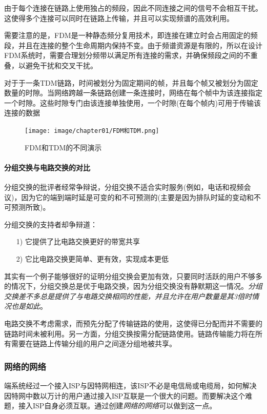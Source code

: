     由于每个连接在链路上使用独占的频段，因此不同连接之间的信号不会相互干扰。这使得多个连接可以同时在链路上传输，并且可以实现频谱的高效利用。
    
    需要注意的是，FDM是一种静态频分复用技术，即连接在建立时会占用固定的频段，并且在连接的整个生命周期内保持不变。由于频谱资源是有限的，所以在设计FDM系统时，需要合理划分频带以满足所有连接的需求，并确保频段之间的不重叠，以避免干扰和交叉干扰。
    
    对于于一条TDM链路，时间被划分为固定期间的帧，并且每个帧又被划分为固定数量的时隙。当网络跨越一条链路创建一条连接时，网络在每个帧中为该连接指定一个时隙。这些时隙专门由该连接单独使用，一个时隙(在每个帧内)可用于传输该连接的数据

\begin{figure}[!htbp]
    \centering
    \texttt{[image: image/chapter01/FDM和TDM.png]}
    \caption{FDM和TDM的不同演示}
\end{figure}

\paragraph{分组交换与电路交换的对比}

    分组交换的批评者经常争辩说，分组交换不适合实时服务(例如，电话和视频会议)，因为它的端到端时延是可变的和不可预测的(主要是因为排队时延的变动和不可预测所致)。

    分组交换的支持者却争辩道：

\begin{itemize}
    \item [1)] 它提供了比电路交换更好的带宽共享
    \item [2)] 它比电路交换更简单、更有效，实现成本更低
\end{itemize}

    其实有一个例子能够很好的证明分组交换会更加有效，只要同时活跃的用户不够多的情况下，分组交换总是优于电路交换，因为分组交换没有静默期这一情况。\emph{分组交换差不多总是提供了与电路交换相同的性能，并且允许在用户数量是其3倍时情况也是如此}。

    电路交换不考虑需求，而预先分配了传输链路的使用，这使得已分配而并不需要的链路时间未被利用。另一方面，分组交换按需分配链路使用。链路传输能力将在所有需要在链路上传输分组的用户之间逐分组地被共享。

\subsubsection{网络的网络}

    端系统经过一个接入ISP与因特网相连，该ISP不必是电信局或电缆局，如何解决因特网中数以万计的用户通过接入ISP互联是一个很大的问题。而要解决这个难题，接入ISP自身必须互联。通过创建\emph{网络的网络}可以做到这一点。

